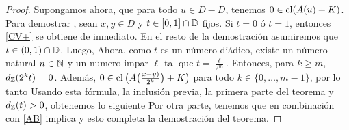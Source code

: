 \begin{proof}
	Supongamos ahora, que para todo $u\in D-D$, tenemos $0\in\mathop{\hbox{\rm cl}}\nolimits(A(u) + K)$.
	Para demostrar , sean $x,y\in D$ y $t\in[0,1]\cap\mathbb{D}$ fijos.
	Si $t=0$ \'o $t=1$, entonces \eqref{CV+} se obtiene de inmediato.
	En el resto de la demostraci\'on asumiremos que $t\in(0,1)\cap\mathbb{D}$.
	Luego,
	Ahora, como $t$ es un n\'umero di\'adico, existe un n\'umero natural $n\in\mathbb{N}$
	y un numero impar $\ell$ tal que $t=\frac{\ell}{2^m}$. Entonces, para $k\geq  m$,
	$d_{\mathbb{Z}}(2^kt)=0$. Adem\'as, $0\in\mathop{\hbox{\rm cl}}\nolimits\big(A\big(\frac{x-y)}{2^k}\big)+K\big)$
	para todo $k\in\{0,\dots,m-1\}$, por lo tanto
	Usando esta f\'ormula, la inclusi\'on previa, la primera parte del teorema y
	 $d_{\mathbb{Z}}(t)>0$, obtenemos lo siguiente
	Por otra parte, tenemos
	que en combinaci\'on con \eqref{AB} implica  y esto completa
	la demostraci\'on del teorema.
\end{proof}


